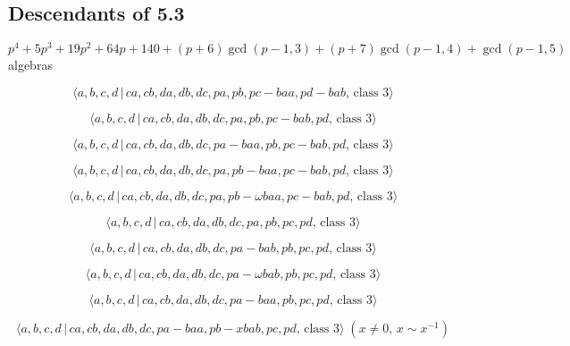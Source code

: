 \documentclass[10pt]{article}
\begin{document}
\subsection{Descendants of 5.3}

$p^{4}+5p^{3}+19p^{2}+64p+140+(p+6)\gcd (p-1,3)+(p+7)\gcd (p-1,4)+\gcd
(p-1,5)$ algebras

\begin{equation}
\langle a,b,c,d\,|\,ca,cb,da,db,dc,pa,pb,pc-baa,pd-bab,\,\text{class }%
3\rangle  \tag{7.3287}
\end{equation}

\begin{equation}
\langle a,b,c,d\,|\,ca,cb,da,db,dc,pa,pb,pc-bab,pd,\,\text{class }3\rangle 
\tag{7.3288}
\end{equation}

\begin{equation}
\langle a,b,c,d\,|\,ca,cb,da,db,dc,pa-baa,pb,pc-bab,pd,\,\text{class }%
3\rangle  \tag{7.3289}
\end{equation}

\begin{equation}
\langle a,b,c,d\,|\,ca,cb,da,db,dc,pa,pb-baa,pc-bab,pd,\,\text{class }%
3\rangle  \tag{7.3290}
\end{equation}

\begin{equation}
\langle a,b,c,d\,|\,ca,cb,da,db,dc,pa,pb-\omega baa,pc-bab,pd,\,\text{class }%
3\rangle  \tag{7.3291}
\end{equation}

\begin{equation}
\langle a,b,c,d\,|\,ca,cb,da,db,dc,pa,pb,pc,pd,\,\text{class }3\rangle 
\tag{7.3292}
\end{equation}

\begin{equation}
\langle a,b,c,d\,|\,ca,cb,da,db,dc,pa-bab,pb,pc,pd,\,\text{class }3\rangle 
\tag{7.3293}
\end{equation}

\begin{equation}
\langle a,b,c,d\,|\,ca,cb,da,db,dc,pa-\omega bab,pb,pc,pd,\,\text{class }%
3\rangle  \tag{7.3294}
\end{equation}

\begin{equation}
\langle a,b,c,d\,|\,ca,cb,da,db,dc,pa-baa,pb,pc,pd,\,\text{class }3\rangle 
\tag{7.3295}
\end{equation}

\begin{equation}
\langle a,b,c,d\,|\,ca,cb,da,db,dc,pa-baa,pb-xbab,pc,pd,\,\text{class }%
3\rangle \;(x\neq 0,\,x\sim x^{-1})  \tag{7.3296}
\end{equation}
\end{document}
